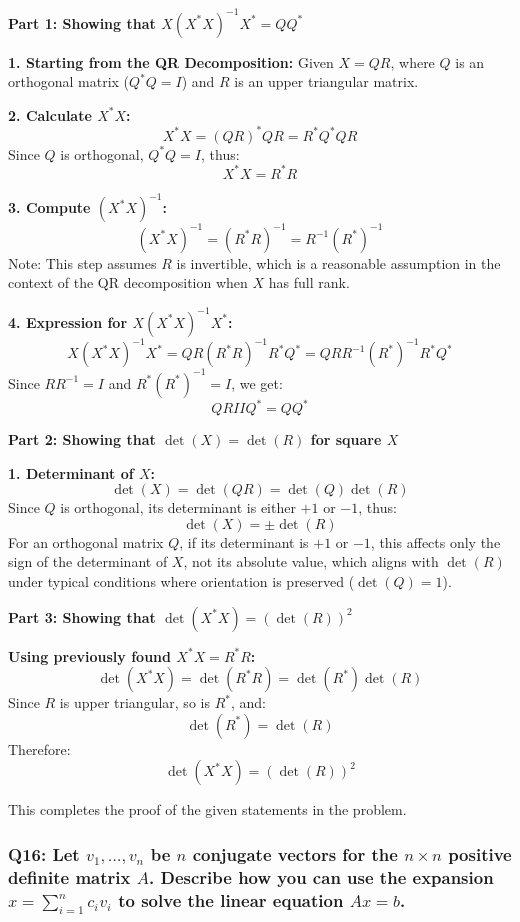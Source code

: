 \documentclass[8pt]{article}
\begin{document}
\textbf{Part 1: Showing that \(X(X^* X)^{-1}X^* = QQ^*\)}

\textbf{1. Starting from the QR Decomposition:} Given \(X = QR\), where \(Q\) is an orthogonal matrix (\(Q^* Q = I\)) and \(R\) is an upper triangular matrix.

\textbf{2. Calculate \(X^* X\):}
   \[
   X^* X = (QR)^* QR = R^* Q^* QR
   \]
   Since \(Q\) is orthogonal, \(Q^* Q = I\), thus:
   \[
   X^* X = R^* R
   \]

\textbf{3. Compute \((X^* X)^{-1}\):}
   \[
   (X^* X)^{-1} = (R^* R)^{-1} = R^{-1} (R^*)^{-1}
   \]
   Note: This step assumes \(R\) is invertible, which is a reasonable assumption in the context of the QR decomposition when \(X\) has full rank.

\textbf{4. Expression for \(X(X^* X)^{-1}X^*\):}
   \[
   X(X^* X)^{-1}X^* = QR (R^* R)^{-1} R^* Q^* = QR R^{-1} (R^*)^{-1} R^* Q^*
   \]
   Since \(RR^{-1} = I\) and \(R^*(R^*)^{-1} = I\), we get:
   \[
   QR I I Q^* = QQ^*
   \]

\textbf{Part 2: Showing that \(\det(X) = \det(R)\) for square \(X\)}

\textbf{1. Determinant of \(X\):}
   \[
   \det(X) = \det(QR) = \det(Q) \det(R)
   \]
   Since \(Q\) is orthogonal, its determinant is either \(+1\) or \(-1\), thus:
   \[
   \det(X) = \pm \det(R)
   \]
   For an orthogonal matrix \(Q\), if its determinant is \(+1\) or \(-1\), this affects only the sign of the determinant of \(X\), not its absolute value, which aligns with \(\det(R)\) under typical conditions where orientation is preserved (\(\det(Q) = 1\)).

\textbf{Part 3: Showing that \(\det(X^* X) = (\det(R))^2\)}

\textbf{Using previously found \(X^* X = R^* R\):}
   \[
   \det(X^* X) = \det(R^* R) = \det(R^*) \det(R)
   \]
   Since \(R\) is upper triangular, so is \(R^*\), and:
   \[
   \det(R^*) = \det(R)
   \]
   Therefore:
   \[
   \det(X^* X) = (\det(R))^2
   \]

This completes the proof of the given statements in the problem.

\subsubsection*{Q16: Let \(v_1, \ldots, v_n\) be \(n\) conjugate vectors for the \(n \times n\) positive definite matrix \(A\). Describe how you can use the expansion \(x = \sum_{i=1}^n c_i v_i\) to solve the linear equation \(Ax = b\).}
\end{document}
